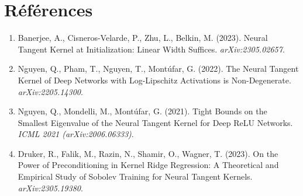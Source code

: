 \documentclass{article}
\begin{document}
\section*{Références}

\begin{enumerate}
    \item Banerjee, A., Cisneros-Velarde, P., Zhu, L., Belkin, M. (2023). Neural Tangent Kernel at Initialization: Linear Width Suffices. \textit{arXiv:2305.02657}.
    \item Nguyen, Q., Pham, T., Nguyen, T., Montúfar, G. (2022). The Neural Tangent Kernel of Deep Networks with Log-Lipschitz Activations is Non-Degenerate. \textit{arXiv:2205.14300}.
    \item Nguyen, Q., Mondelli, M., Montúfar, G. (2021). Tight Bounds on the Smallest Eigenvalue of the Neural Tangent Kernel for Deep ReLU Networks. \textit{ICML 2021 (arXiv:2006.06333)}.
    \item Druker, R., Falik, M., Razin, N., Shamir, O., Wagner, T. (2023). On the Power of Preconditioning in Kernel Ridge Regression: A Theoretical and Empirical Study of Sobolev Training for Neural Tangent Kernels. \textit{arXiv:2305.19380}.
\end{enumerate}
\end{document}
